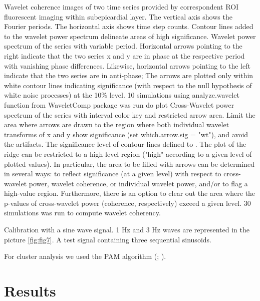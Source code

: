 \documentclass{biophys-new}
\begin{document}
Wavelet coherence images of two time series provided by correspondent ROI fluorescent imaging within subepicardial layer.
The vertical axis shows the Fourier periods. The horizontal axis shows time step counts.
Contour lines added to the wavelet power spectrum delineate areas of high significance.
Wavelet power spectrum of the series with variable period.
Horizontal arrows pointing to the right indicate that the two series x and y are in phase at the respective period with vanishing phase differences.
Likewise, horizontal arrows pointing to the left indicate that the two series are in anti-phase;
The arrows are plotted only within white contour lines indicating significance (with respect to the null hypothesis of white noise processes) at the 10\% level.
10 simulations using analyze.wavelet function from WaveletComp package was run do plot Cross-Wavelet power spectrum of the series with interval color key and restricted arrow area.
Limit the area where arrows are drawn to the region where both individual wavelet transforms of x and y show significance (set which.arrow.sig = "wt"), and avoid the artifacts.
The significance level of contour lines defined to . The plot of the ridge can be restricted to a high-level region ("high" according to a given level of plotted values).
In particular, the area to be filled with arrows can be determined in several ways: to reflect significance (at a given level) with respect to cross-wavelet power, wavelet coherence, or individual wavelet power, and/or to flag a high-value region. Furthermore, there is an option to clear out the area where the p-values of cross-wavelet power (coherence, respectively) exceed a given level.
30 simulations was run to compute wavelet coherency.

Calibration with a sine wave signal.
1 Hz and 3 Hz waves are represented in the picture \ref{fig:fig7}.
A test signal containing three sequential sinusoids.

For cluster analysis we used the PAM algorithm (\cite{kaufman2009finding}; \cite{kassambara2017practical}).


\section*{Results}
\end{document}
